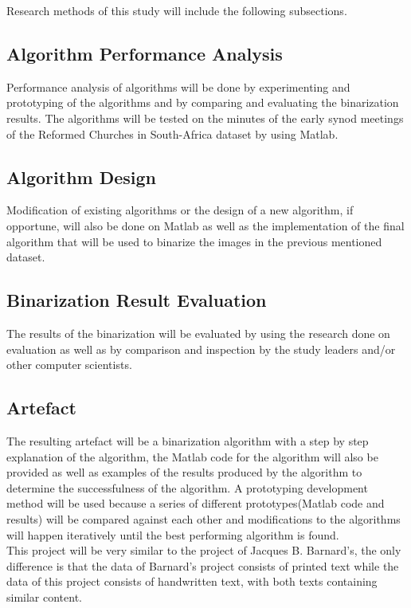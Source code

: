 \documentclass[11pt]{article}
\begin{document}
	Research methods of this study will include the following subsections.

	\subsection{Algorithm Performance Analysis}
		Performance analysis of algorithms will be done by experimenting and prototyping of the algorithms and by comparing and evaluating the binarization results. The algorithms will be tested on the minutes of the early synod meetings of the Reformed Churches in South-Africa dataset by using Matlab.

	\subsection{Algorithm Design}
		Modification of existing algorithms or the design of a new algorithm, if opportune, will also be done on Matlab as well as the implementation of the final algorithm that will be used to binarize the images in the previous mentioned dataset.

	\subsection{Binarization Result Evaluation}
		The results of the binarization will be evaluated by using the research done on evaluation as well as by comparison and inspection by the study leaders and/or other computer scientists.

	\subsection{Artefact}
		The resulting artefact will be a binarization algorithm with a step by step explanation of the algorithm, the Matlab code for the algorithm will also be provided as well as examples of the results produced by the algorithm to determine the successfulness of the algorithm. A prototyping development method will be used because a series of different prototypes(Matlab code and results) will be compared against each other and modifications to the algorithms will happen iteratively until the best performing algorithm is found.\\

		This project will be very similar to the project of Jacques B. Barnard's, the only difference is that the data of Barnard's project consists of printed text while the data of this project consists of handwritten text, with both texts containing similar content.
\end{document}
